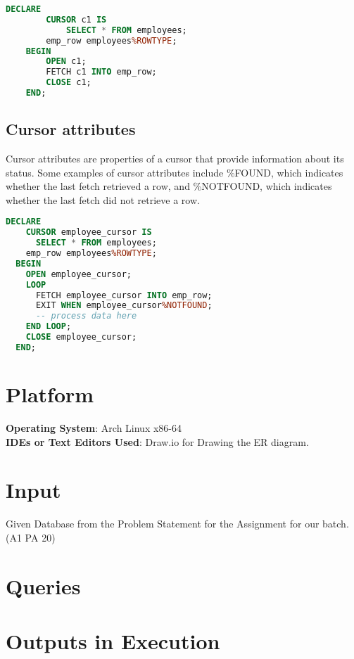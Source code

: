 \documentclass[11pt]{article}
\begin{document}
\begin{lstlisting}[language=sql]
    DECLARE
        CURSOR c1 IS
            SELECT * FROM employees;
        emp_row employees%ROWTYPE;
    BEGIN
        OPEN c1;
        FETCH c1 INTO emp_row;
        CLOSE c1;
    END;
\end{lstlisting}

\subsection{Cursor attributes}
Cursor attributes are properties of a cursor that provide information about its status. Some examples of cursor attributes include \%FOUND, which indicates whether the last fetch retrieved a row, and \%NOTFOUND, which indicates whether the last fetch did not retrieve a row.

\begin{lstlisting}[language=sql]
  DECLARE
    CURSOR employee_cursor IS
      SELECT * FROM employees;
    emp_row employees%ROWTYPE;
  BEGIN
    OPEN employee_cursor;
    LOOP
      FETCH employee_cursor INTO emp_row;
      EXIT WHEN employee_cursor%NOTFOUND;
      -- process data here
    END LOOP;
    CLOSE employee_cursor;
  END;
\end{lstlisting}

\section{Platform}
\textbf{Operating System}: Arch Linux x86-64 \\
\textbf{IDEs or Text Editors Used}: Draw.io for Drawing the ER diagram. \\


\section{Input}
Given Database from the Problem Statement for the Assignment for our batch. (A1 PA 20)

\section{Queries}


\section{Outputs in Execution}

\end{document}
